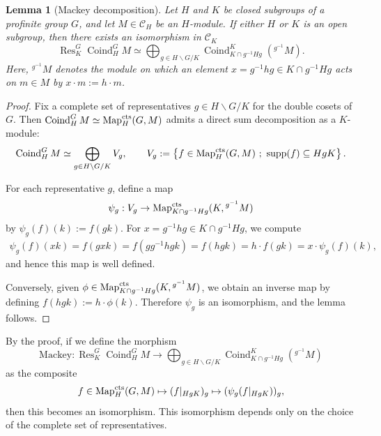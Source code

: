 \documentclass{article}
\numberwithin{equation}{section} %
\newtheorem{lemm}{Lemma}[section]
\begin{document}
    \begin{lemm}[Mackey decomposition]
        Let $H$ and $K$ be closed subgroups of a profinite group $G$, and let $M \in \mathscr{C}_H$ be an $H$-module. If either $H$ or $K$ is an open subgroup, then there exists an isomorphism in $\mathscr{C}_K$
        \[
          \operatorname{Res}_K^G\operatorname{Coind}_H^G M
          \simeq
          \bigoplus_{g \in H \backslash G / K}
          \operatorname{Coind}_{K\cap g^{-1}Hg}^K \left({}^{g^{-1}}M\right).
        \]
        Here, ${}^{g^{-1}}M$ denotes the module on which an element $x = g^{-1}hg \in K\cap g^{-1}Hg$ acts on $m\in M$ by $ x\cdot m := h\cdot m$.
    \end{lemm}

    \begin{proof}
        Fix a complete set of representatives $g \in H \backslash G / K$ for the double cosets of $G$. Then $\operatorname{Coind}_H^G M
        \simeq
        \operatorname{Map}_H^{\rm cts}(G,M)$ admits a direct sum decomposition as a $K$-module:
        \[
          \operatorname{Coind}_H^G M
          \simeq
          \bigoplus_{g \in H \backslash G / K} V_g,
          \qquad
          V_g
          :=
          \left\{
          f \in \operatorname{Map}_H^{\rm cts}(G,M)
          \ ; \
          \operatorname{supp}(f) \subseteq HgK
          \right\}.
        \]

        For each representative $g$, define a map
        \[
          \psi_g :
          V_g
          \to
          \operatorname{Map}_{K\cap g^{-1}Hg}^{\rm cts}(K,{}^{g^{-1}}M)
        \]
        by $\psi_g(f)(k) := f(gk)$. For $x = g^{-1}hg \in K\cap g^{-1}Hg$, we compute
        \begin{align*}
            \psi_g(f)(xk)
            =
            f(gxk)
            =
            f(gg^{-1}hgk)
            =
            f(hgk)
            =
            h\cdot f(gk)
            =
            x \cdot \psi_g(f)(k),
        \end{align*}
        and hence this map is well defined.

        Conversely, given $\phi \in \operatorname{Map}_{K\cap g^{-1}Hg}^{\rm cts}(K,{}^{g^{-1}}M)$, we obtain an inverse map by defining $f(hgk) := h\cdot \phi(k)$. Therefore $\psi_g$ is an isomorphism, and the lemma follows.
    \end{proof}

    By the proof, if we define the morphism
        \[
          \mathrm{Mackey}:
          \operatorname{Res}_K^G\operatorname{Coind}_H^G M
          \to
          \bigoplus_{g \in H \backslash G / K}
          \operatorname{Coind}_{K\cap g^{-1}Hg}^K
          \left({}^{g^{-1}}M\right)
        \]
        as the composite
        \[
          f \in \operatorname{Map}_H^{\rm cts}(G,M)
          \mapsto
          (f|_{HgK})_g
          \mapsto
          (\psi_g(f|_{HgK}))_g,
        \]
        then this becomes an isomorphism. This isomorphism depends only on the choice of the complete set of representatives.
\end{document}
